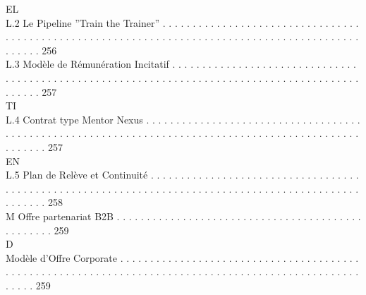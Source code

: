 \documentclass[12pt,landscape,a4paper]{article}
\begin{document}
\vspace{0.5em}
\vspace{0.5em}
EL\\
L.2     Le Pipeline ”Train the Trainer” . . . . . . . . . . . . . . . . . . . . . . . . . . . . . . . . . . . . . . . . . . . . . . . . . . . . . . . . . . . . . . . . . . . . . . . . . . . . . . . . . . . . . . . . . . . . . . . . . . 256\\
L.3     Modèle de Rémunération Incitatif . . . . . . . . . . . . . . . . . . . . . . . . . . . . . . . . . . . . . . . . . . . . . . . . . . . . . . . . . . . . . . . . . . . . . . . . . . . . . . . . . . . . . . . . . . . . . . . . 257\\
\vspace{0.5em}
\vspace{0.5em}
\vspace{0.5em}
\vspace{0.5em}
TI\\
L.4     Contrat type Mentor Nexus . . . . . . . . . . . . . . . . . . . . . . . . . . . . . . . . . . . . . . . . . . . . . . . . . . . . . . . . . . . . . . . . . . . . . . . . . . . . . . . . . . . . . . . . . . . . . . . . . . . . . . 257\\
\vspace{0.5em}
\vspace{0.5em}
\vspace{0.5em}
\vspace{0.5em}
EN\\
L.5     Plan de Relève et Continuité . . . . . . . . . . . . . . . . . . . . . . . . . . . . . . . . . . . . . . . . . . . . . . . . . . . . . . . . . . . . . . . . . . . . . . . . . . . . . . . . . . . . . . . . . . . . . . . . . . . . . 258\\
\vspace{0.5em}
M     Offre partenariat B2B . . . . . . . . . . . . . . . . . . . . . . . . . . . . . . . . . . . . . . . . . . . . . . . . . 259\\
\vspace{0.5em}
\vspace{0.5em}
\vspace{0.5em}
\vspace{0.5em}
D\\
Modèle d’Offre Corporate . . . . . . . . . . . . . . . . . . . . . . . . . . . . . . . . . . . . . . . . . . . . . . . . . . . . . . . . . . . . . . . . . . . . . . . . . . . . . . . . . . . . . . . . . . . . . . . . . . . . . . . . 259\\
\vspace{0.5em}
\end{document}
